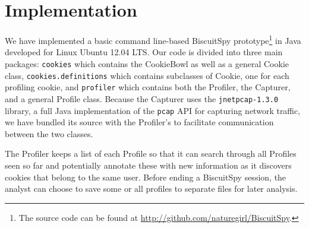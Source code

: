 \section{Implementation}
\label{sec:implementation}

We have implemented a basic command line-based BiscuitSpy prototype\footnote{The source code can be found at \url{http://github.com/naturegirl/BiscuitSpy}.} in Java developed for Linux Ubuntu 12.04 LTS.
Our code is divided into three main packages: \texttt{cookies} which contains the CookieBowl as well as a general Cookie class, \texttt{cookies.definitions} which contains subclasses of Cookie, one for each profiling cookie, and \texttt{profiler} which contains both the Profiler, the Capturer, and a general Profile class.
Because the Capturer uses the \texttt{jnetpcap-1.3.0} library, a full Java implementation of the \texttt{pcap} API for capturing network traffic, we have bundled its source with the Profiler's to facilitate communication between the two classes.

The Profiler keeps a list of each Profile so that it can search through all Profiles seen so far and potentially annotate these with new information as it discovers cookies that belong to the same user. 
Before ending a BiscuitSpy session, the analyst can choose to save some or all profiles to separate files for later analysis.